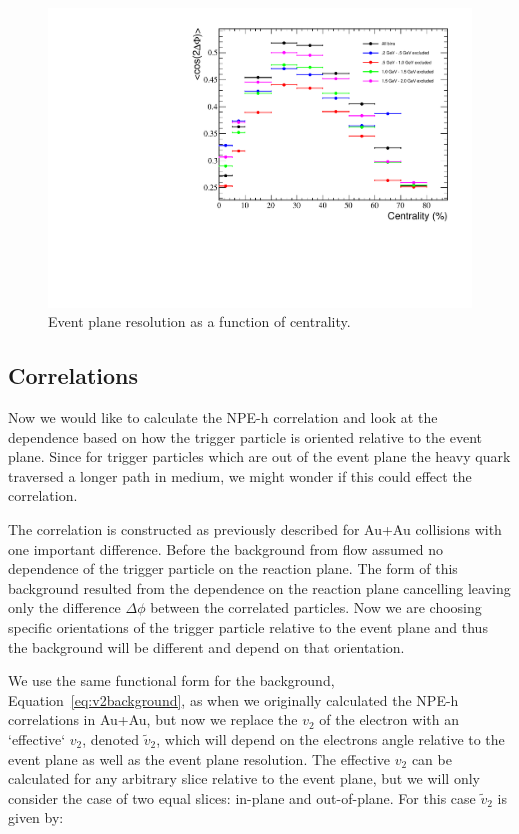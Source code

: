 \begin{figure}[htbp]
\begin{center}
\includegraphics[scale=.8]{Plots/Correlations/EPRes_MRP.pdf}
\end{center}
\caption[Event Plane Resolutions]{Event plane resolution as a function of centrality.}
\label{fig:EPRes_MRP}
\end{figure}

\subsection{Correlations}

Now we would like to calculate the NPE-h correlation and look at the dependence based on how the trigger particle is oriented relative to the event plane. Since for trigger particles which are out of the event plane the heavy quark traversed a longer path in medium, we might wonder if this could effect the correlation.

The correlation is constructed as previously described for Au+Au collisions with one important difference. Before the background from flow assumed no dependence of the trigger particle on the reaction plane. The form of this background resulted from the dependence on the reaction plane cancelling leaving only the difference $\Delta\phi$ between the correlated particles. Now we are choosing specific orientations of the trigger particle relative to the event plane and thus the background will be different and depend on that orientation.

We use the same functional form for the background, Equation~\ref{eq:v2background}, as when we originally calculated the NPE-h correlations in Au+Au, but now we replace the $v_2$ of the electron with an `effective` $v_2$, denoted $\widetilde{v}_{2}$, which will depend on the electrons angle relative to the event plane as well as the event plane resolution. The effective $v_2$ can be calculated for any arbitrary slice relative to the event plane, but we will only consider the case of two equal slices: in-plane and out-of-plane. For this case $\widetilde{v}_{2}$ is given by:

